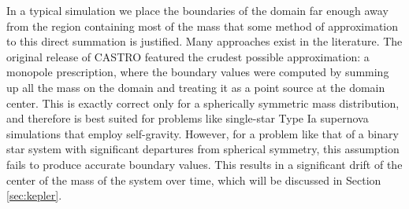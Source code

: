 \documentclass[12pt,preprint]{aastex}
\begin{document}
In a typical simulation we place the boundaries of the domain far enough away from the region containing most of the mass that some method of approximation to this direct summation is justified. Many approaches exist in the literature. The original release of CASTRO featured the crudest possible approximation: a monopole prescription, where the boundary values were computed by summing up all the mass on the domain and treating it as a point source at the domain center. This is exactly correct only for a spherically symmetric mass distribution, and therefore is best suited for problems like single-star Type Ia supernova simulations that employ self-gravity. However, for a problem like that of a binary star system with significant departures from spherical symmetry, this assumption fails to produce accurate boundary values. This results in a significant drift of the center of the mass of the system over time, which will be discussed in Section \ref{sec:kepler}.
\end{document}
